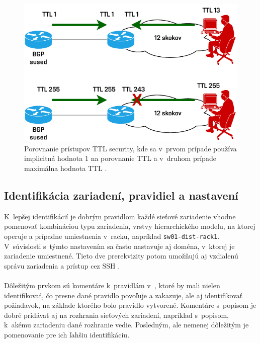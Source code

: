 \begin{figure}[H]
	\begin{center}
		\includegraphics[scale=1]{obrazky/ttl-sec.pdf}
	\end{center}
	\caption[Porovnanie prístupov TTL security]{Porovnanie prístupov TTL security, kde sa v~prvom prípade používa implicitná hodnota 1 na porovnanie TTL a v~druhom prípade maximálna hodnota TTL \cite{AlHFaPbj6IbKzbuv}.}
	\label{fig:ttl-sec}
\end{figure} 


\subsection{Identifikácia zariadení, pravidiel a nastavení}
K~lepšej identifikácií je dobrým pravidlom každé sieťové zariadenie vhodne pomenovať kombináciou typu zariadenia, vrstvy hierarchického modelu, na ktorej operuje a prípadne umiestnenia v~racku, napríklad \texttt{sw01-dist-rack1}. V~súvislosti s~týmto nastavením sa často nastavuje aj doména, v~ktorej je zariadenie umiestnené. Tieto dve prerekvizity potom umožňujú aj vzdialenú správu zariadenia a prístup cez SSH \cite{CIS_DrTLsgXv24lxeIIM}.
\\\\   
\noindent
Dôležitým prvkom sú komentáre k~pravidlám v~, ktoré by mali nielen identifikovať, čo presne dané pravidlo povoľuje a zakazuje, ale aj identifikovať požiadavok, na základe ktorého bolo pravidlo vytvorené. Komentáre s~popisom je dobré pridávať aj na rozhrania sieťových zariadení, napríklad s~popisom, k~akému zariadeniu dané rozhranie vedie. Posledným, ale nemenej dôležitým je pomenovanie  pre ich ľahšiu identifikáciu.

